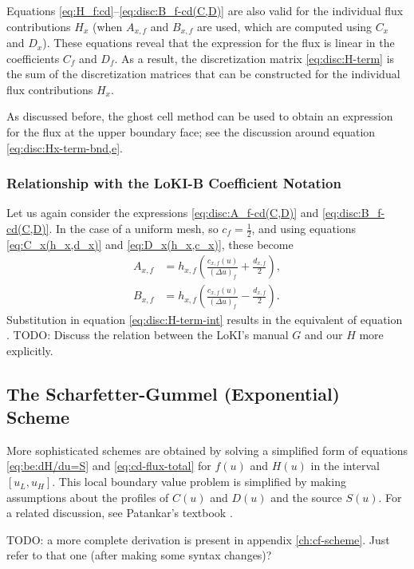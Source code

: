 \documentclass{book}
\begin{document}
Equations \eqref{eq:H_f:cd}--\eqref{eq:disc:B_f-cd(C,D)} are also valid for
the individual flux contributions $H_x$ (when $A_{x,f}$ and $B_{x,f}$ are
used, which are computed using $C_x$ and $D_x$). These equations reveal that
the expression for the flux is linear in the coefficients $C_f$ and $D_f$.
As a result, the discretization matrix \eqref{eq:disc:H-term} is the sum of
the discretization matrices that can be constructed for the individual flux
contributions $H_x$.

As discussed before, the ghost cell method can be used to obtain an expression
for the flux at the upper boundary face; see the discussion around equation
\eqref{eq:disc:Hx-term-bnd,e}.

\subsubsection{Relationship with the LoKI-B Coefficient Notation}

Let us again consider the expressions \eqref{eq:disc:A_f-cd(C,D)} and
\eqref{eq:disc:B_f-cd(C,D)}. In the case of a uniform mesh, so
$c_f=\frac{1}{2}$, and using equations \eqref{eq:C_x(h_x,d_x)} and
\eqref{eq:D_x(h_x,c_x)}, these become
\begin{align}
	A_{x,f} &= h_{x,f}\left(\frac{c_{x,f}(u)}{(\Delta u)_f}+\frac{d_{x,f}}{2} \right), \label{eq:disc:A_f-cd(hx,cx,dx)} \\
	B_{x,f} &= h_{x,f}\left(\frac{c_{x,f}(u)}{(\Delta u)_f}-\frac{d_{x,f}}{2} \right). \label{eq:disc:B_f-cd(hx,cx,dx)}
\end{align}
Substitution in equation \eqref{eq:disc:H-term-int} results in the equivalent
of equation \cite[eq. 25b]{Manual_2_2_0}.
TODO: Discuss the relation between the LoKI's manual $G$ and our $H$ more explicitly.

\subsection{The Scharfetter-Gummel (Exponential) Scheme}

More sophisticated schemes are obtained by solving a simplified form of
equations \eqref{eq:be:dH/du=S} and \eqref{eq:cd-flux-total} for $f(u)$
and $H(u)$ in the interval $[u_L,u_H]$. This local boundary value problem
is simplified by making assumptions about the profiles of $C(u)$ and $D(u)$
and the source $S(u)$. For a related discussion, see Patankar's textbook
\cite[sec. 7.2--7]{Patankar1980}.

TODO: a more complete derivation is present in appendix \ref{ch:cf-scheme}.
Just refer to that one (after making some syntax changes)?
\end{document}
